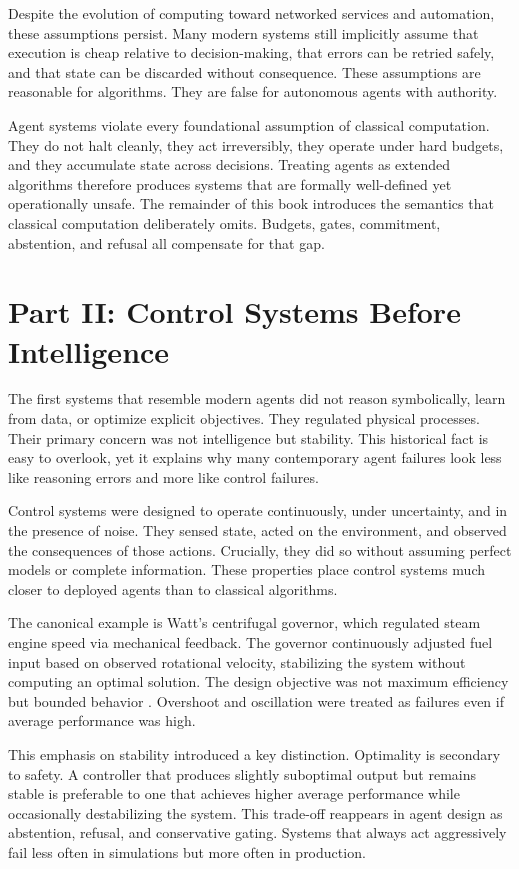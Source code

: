 Despite the evolution of computing toward networked services and automation, these
assumptions persist. Many modern systems still implicitly assume that execution is
cheap relative to decision-making, that errors can be retried safely, and that
state can be discarded without consequence. These assumptions are reasonable for
algorithms. They are false for autonomous agents with authority.

Agent systems violate every foundational assumption of classical computation. They
do not halt cleanly, they act irreversibly, they operate under hard budgets, and
they accumulate state across decisions. Treating agents as extended algorithms
therefore produces systems that are formally well-defined yet operationally
unsafe. The remainder of this book introduces the semantics that classical computation deliberately omits. Budgets, gates, commitment, abstention, and refusal all compensate for that gap.

\section{Part II: Control Systems Before Intelligence}

The first systems that resemble modern agents did not reason symbolically, learn
from data, or optimize explicit objectives. They regulated physical processes.
Their primary concern was not intelligence but stability. This historical fact is
easy to overlook, yet it explains why many contemporary agent failures look less
like reasoning errors and more like control failures.

Control systems were designed to operate continuously, under uncertainty, and in
the presence of noise. They sensed state, acted on the environment, and observed
the consequences of those actions. Crucially, they did so without assuming perfect
models or complete information. These properties place control systems much closer
to deployed agents than to classical algorithms.

The canonical example is Watt’s centrifugal governor, which regulated steam engine
speed via mechanical feedback. The governor continuously adjusted fuel input based
on observed rotational velocity, stabilizing the system without computing an
optimal solution. The design objective was not maximum efficiency but bounded
behavior \cite{bennett1979history}. Overshoot and oscillation were treated as
failures even if average performance was high.

This emphasis on stability introduced a key distinction. Optimality is secondary
to safety. A controller that produces slightly suboptimal output but remains
stable is preferable to one that achieves higher average performance while
occasionally destabilizing the system. This trade-off reappears in agent design as
abstention, refusal, and conservative gating. Systems that always act aggressively
fail less often in simulations but more often in production.

